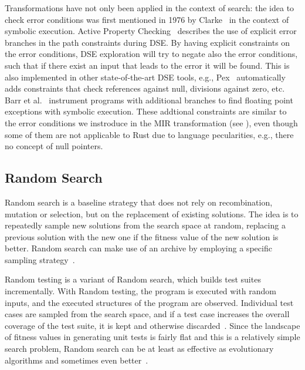 \documentclass{article}
\begin{document}

Transformations have not only been applied in the context of search: the idea to check error conditions was first mentioned in 1976 by Clarke~\cite{Clarke1976} in the context of symbolic execution. Active Property Checking~\cite{Godefroid_2005} describes the use of explicit error branches in the path constraints during \ac{DSE}. By having explicit constraints on the error conditions, \ac{DSE} exploration will try to negate also the error conditions, such that if there exist an input that leads to the error it will be found. This is also implemented in other state-of-the-art \ac{DSE} tools, e.g., Pex~\cite{Tillmann2008} automatically adds constraints that check references against null, divisions against zero, etc. Barr et al.~\cite{Barr2013} instrument programs with additional branches to find floating point exceptions with symbolic execution. These addtional constraints are similar to the error conditions we instroduce in the \ac{MIR} transformation (see ), even though some of them are not applicable to Rust due to language pecularities, e.g., there no concept of null pointers. 

\subsection{Random Search}  
Random search is a baseline strategy that does not rely on recombination, mutation or selection, but on the replacement of existing solutions. The idea is to repeatedly sample new solutions from the search space at random, replacing a previous solution with the new one if the fitness value of the new solution is better. Random search can make use of an archive by employing a specific sampling strategy~\cite{Campos2017}.

Random testing is a variant of Random search, which builds test suites incrementally. With Random testing, the program is executed with random inputs, and the executed structures of the program are observed. Individual test cases are sampled from the search space, and if a test case increases the overall coverage of the test suite, it is kept and otherwise discarded~\cite{Campos2017}. Since the landscape of fitness values in generating unit tests is fairly flat and this is a relatively simple search problem, Random search can be at least as effective as evolutionary algorithms and sometimes even better~\cite{Shamshiri2015a}.
\end{document}
